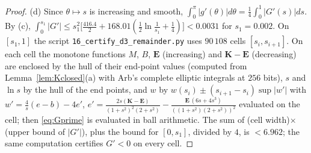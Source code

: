 \documentclass[11pt,a4paper]{article}
\theoremstyle{plain}
\theoremstyle{definition}
\numberwithin{equation}{section}
\begin{document}
\begin{proof}
(d) Since $\theta\mapsto s$ is increasing and smooth, $\int_0^\pi|g'(\theta)|d\theta=\frac14\int_0^1|G'(s)|ds$. By (c), $\int_0^{s_1}|G'|\le s_1^2\big[\frac{416.4}{2}+168.01(\frac12\ln\frac1{s_1}+\frac14)\big]<0.0031$ for $s_1=0.002$. On $[s_1,1]$ the script \texttt{16\_certify\_d3\_remainder.py} uses $90\,108$ cells $[s_i,s_{i+1}]$. On each cell the monotone functions $M$, $B$, $\mathbf E$ (increasing) and $\mathbf K-\mathbf E$ (decreasing) are enclosed by the hull of their end-point values (computed from Lemma~\ref{lem:Kclosed}(a) with Arb's complete elliptic integrals at $256$ bits), $s$ and $\ln s$ by the hull of the end points, and $w$ by $w(s_i)\pm(s_{i+1}-s_i)\sup|w'|$ with $w'=\frac4s(e-b)-4e'$, $e'=\frac{2s(\mathbf K-\mathbf E)}{(1+s^2)^2(2+s^2)}-\frac{\mathbf E\,(6s+4s^3)}{((1+s^2)(2+s^2))^2}$ evaluated on the cell; then \eqref{eq:Gprime} is evaluated in ball arithmetic. The sum of (cell width)$\times$(upper bound of $|G'|$), plus the bound for $[0,s_1]$, divided by $4$, is $<6.962$; the same computation certifies $G'<0$ on every cell.
\end{proof}
\end{document}
